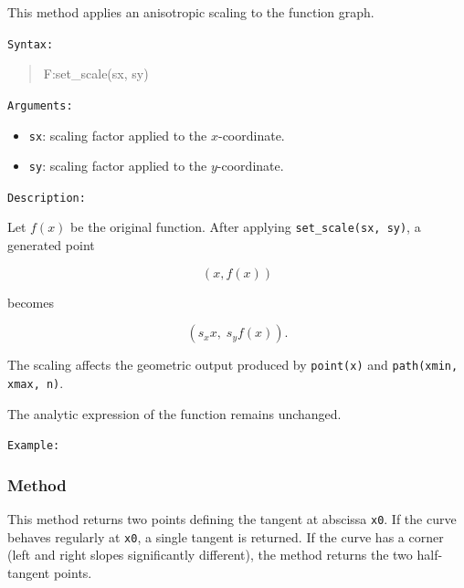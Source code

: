This method applies an anisotropic scaling to the function graph.

\medskip
\texttt{Syntax: }
\begin{quote}
F:set\_scale(sx, sy)
\end{quote}

\medskip
\texttt{Arguments: }
\begin{itemize}
\item \texttt{sx}: scaling factor applied to the $x$-coordinate.
\item \texttt{sy}: scaling factor applied to the $y$-coordinate.
\end{itemize}

\medskip
\texttt{Description: }

Let $f(x)$ be the original function.
After applying \texttt{set\_scale(sx, sy)}, a generated point

\[
(x, f(x))
\]

becomes

\[
(s_x x,\; s_y f(x)).
\]

The scaling affects the geometric output produced by
\texttt{point(x)} and \texttt{path(xmin, xmax, n)}.

The analytic expression of the function remains unchanged.

\medskip
\texttt{Example: }

\begin{tkzexample}[vbox]
\begin{center}
\end{center}
\end{tkzexample}




\subsubsection{Method }
\label{ssub:fct_tangent}

This method returns two points defining the tangent at abscissa \texttt{x0}.
If the curve behaves regularly at \texttt{x0}, a single tangent is returned.
If the curve has a corner (left and right slopes significantly different),
the method returns the two half-tangent points.

